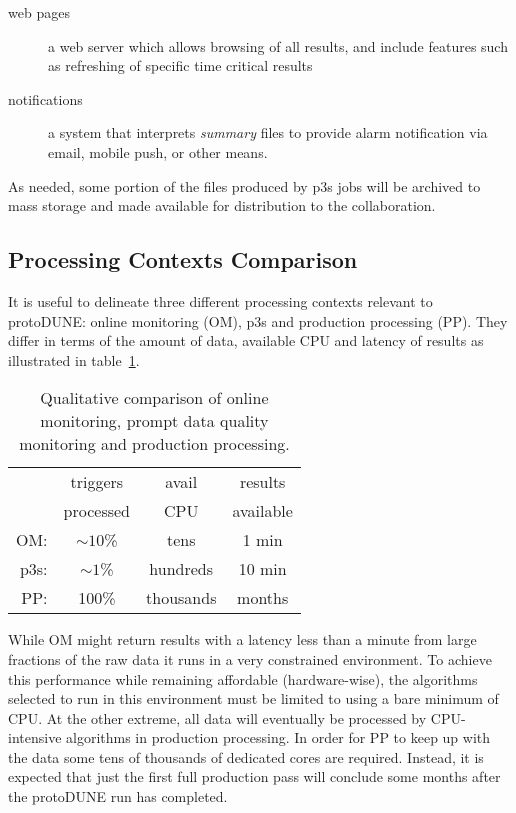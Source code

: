 \documentclass[pdftex,12pt,letter]{article}
\begin{document}
\begin{description}
\item[web pages] a web server which allows browsing of all results, and include features such as refreshing of specific time critical results
\item[notifications] a system that interprets \textit{summary} files to provide alarm notification via email, mobile push, or other means.
\end{description}

As needed, some portion of the files produced by p3s jobs will be
archived to mass storage and made available for distribution to the
collaboration.


\subsection{Processing Contexts Comparison}

It is useful to delineate three different processing contexts relevant
to protoDUNE: online monitoring (OM), p3s and production processing
(PP).  They differ in terms of the amount of data, available CPU and
latency of results as illustrated in table~\ref{tab:contexts}.

\begin{table}[h]
  \centering
  \begin{tabular}[h]{r|ccc}
    & triggers & avail & results \\
    & processed &  CPU & available \\
    \hline
    OM: & $\sim 10$\% & tens & 1 min \\
    p3s: & $\sim 1$\% & hundreds & 10 min \\
    PP: & 100\% & thousands & months \\
  \end{tabular}
  \caption{Qualitative comparison of online monitoring, prompt data quality monitoring and production processing.}
  \label{tab:contexts}
\end{table}

While OM might return results with a latency less than a minute from
large fractions of the raw data it runs in a very constrained
environment.  To achieve this performance while remaining affordable
(hardware-wise), the algorithms selected to run in this environment
must be limited to using a bare minimum of CPU.  At the other extreme,
all data will eventually be processed by CPU-intensive algorithms in
production processing.  In order for PP to keep up with the data some
tens of thousands of dedicated cores are required.  Instead, it is
expected that just the first full production pass will conclude some
months after the protoDUNE run has completed.  
\end{document}
